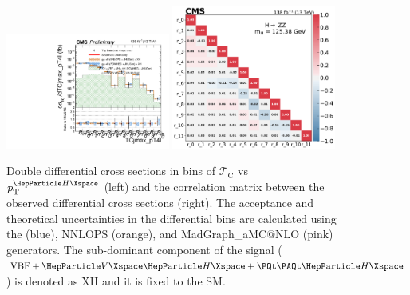 \begin{center}
	\begin{figure}[!htb]
		\centering
		\includegraphics[width=0.48\textwidth]{Images/H4L/doublediff/TCjmax_pT4l_unfoldwith_SM_125_logscale_asimov.pdf}
		\includegraphics[width=0.48\textwidth]{Images/H4L/correlations/corr_TCjmax_pT4l_v3.pdf}\\
		\caption{
			Double differential cross sections in bins of $\mathcal{T}_{\text{C}}$ vs $\pt^{\PH}$ (left) and the correlation matrix between the observed differential cross sections (right).
			The acceptance and theoretical uncertainties in the differential bins are calculated using the \POWHEG (blue), NNLOPS (orange), and MadGraph\_aMC@NLO (pink) generators.
			The sub-dominant component of the signal ($\VBF + \VH + \ttH$) is denoted as XH and it is fixed to the SM.
			\label{fig:fidTCPTH}}
	\end{figure}
\end{center}

\clearpage

